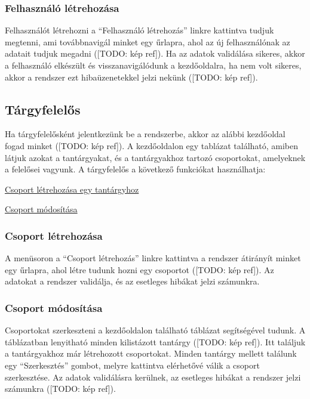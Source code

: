 \subsubsection{Felhasználó létrehozása}
Felhasználót létrehozni a ``Felhasználó létrehozás'' linkre kattintva tudjuk megtenni, ami továbbnavigál minket egy űrlapra, ahol az új felhasználónak az adatait tudjuk megadni ([TODO: kép ref]). Ha az adatok validálása sikeres, akkor a felhasználó elkészült és visszanavigálódunk a kezdőoldalra, ha nem volt sikeres, akkor a rendszer ezt hibaüzenetekkel jelzi nekünk ([TODO: kép ref]).
\subsection{Tárgyfelelős}\label{step:teacher-role}
Ha tárgyfelelősként jelentkezünk be a rendszerbe, akkor az alábbi kezdőoldal fogad minket ([TODO: kép ref]).
A kezdőoldalon egy tablázat található, amiben látjuk azokat a tantárgyakat, és a tantárgyakhoz tartozó csoportokat, amelyeknek a felelősei vagyunk.
A tárgyfelelős a következő funkciókat használhatja:
\begin{compactitem}
    \item \hyperref[step:teacher-create-course]{Csoport létrehozása egy tantárgyhoz}
    \item \hyperref[step:teacher-create-course]{Csoport módosítása}
\end{compactitem}
\subsubsection{Csoport létrehozása}
\label{step:teacher-create-course}
A menüsoron a ``Csoport létrehozás'' linkre kattintva a rendszer átirányít minket egy űrlapra, ahol létre tudunk hozni egy csoportot ([TODO: kép ref]). Az adatokat a rendszer validálja, és az esetleges hibákat jelzi számunkra.
\subsubsection{Csoport módosítása}
\label{step:teacher-edit-course}
Csoportokat szerkeszteni a kezdőoldalon található táblázat segítségével tudunk. A táblázatban lenyitható minden kilistázott tantárgy ([TODO: kép ref]). Itt találjuk a tantárgyakhoz már létrehozott csoportokat. Minden tantárgy mellett találunk egy ``Szerkesztés'' gombot, melyre kattintva elérhetővé válik a csoport szerkesztése. Az adatok validálásra kerülnek, az esetleges hibákat a rendszer jelzi számunkra ([TODO: kép ref]).
